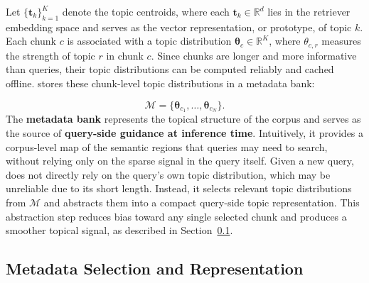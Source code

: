Let $\{\mathbf{t}_k\}_{k=1}^{K}$ denote the topic centroids, where each $\mathbf{t}_k \in \mathbb{R}^{d}$ lies in the retriever embedding space and serves as the vector representation, or prototype, of topic $k$. Each chunk $c$ is associated with a topic distribution $\boldsymbol{\theta}_c \in \mathbb{R}^{K}$, where $\theta_{c,r}$ measures the strength of topic $r$ in chunk $c$. Since chunks are longer and more informative than queries, their topic distributions can be computed reliably and cached offline. \name{} stores these chunk-level topic distributions in a metadata bank:

\begin{equation}
    \mathcal{M} = \{\boldsymbol{\theta}_{c_1}, \ldots, \boldsymbol{\theta}_{c_N}\}.
\end{equation}
The \textbf{metadata bank} represents the topical structure of the corpus and serves as the source of \textbf{query-side guidance at inference time}. Intuitively, it provides a corpus-level map of the semantic regions that queries may need to search, without relying only on the sparse signal in the query itself. Given a new query, \name{} does not directly rely on the query's own topic distribution, which may be unreliable due to its short length. Instead, it selects relevant topic distributions from $\mathcal{M}$ and abstracts them into a compact query-side topic representation. This abstraction step reduces bias toward any single selected chunk and produces a smoother topical signal, as described in Section~\ref{sec:selection_representation}.

\subsection{Metadata Selection and Representation}
\label{sec:selection_representation}

